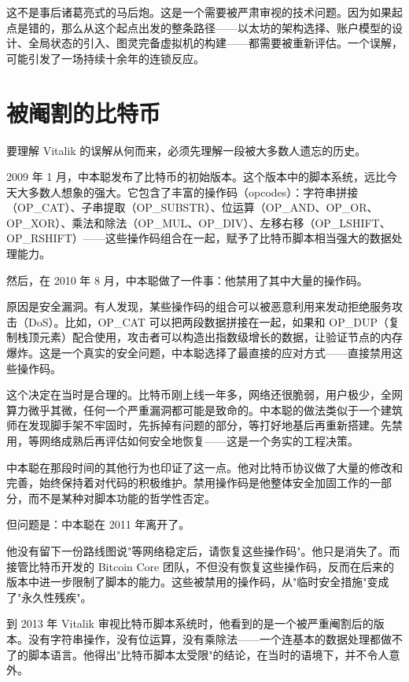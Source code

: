 \documentclass[a4paper,12pt,openany]{ctexbook}
\begin{document}
这不是事后诸葛亮式的马后炮。这是一个需要被严肃审视的技术问题。因为如果起点是错的，那么从这个起点出发的整条路径——以太坊的架构选择、账户模型的设计、全局状态的引入、图灵完备虚拟机的构建——都需要被重新评估。一个误解，可能引发了一场持续十余年的连锁反应。


\section*{被阉割的比特币}


要理解 Vitalik 的误解从何而来，必须先理解一段被大多数人遗忘的历史。

2009 年 1 月，中本聪发布了比特币的初始版本。这个版本中的脚本系统，远比今天大多数人想象的强大。它包含了丰富的操作码（opcodes）：字符串拼接（OP\_CAT）、子串提取（OP\_SUBSTR）、位运算（OP\_AND、OP\_OR、OP\_XOR）、乘法和除法（OP\_MUL、OP\_DIV）、左移右移（OP\_LSHIFT、OP\_RSHIFT）——这些操作码组合在一起，赋予了比特币脚本相当强大的数据处理能力。

然后，在 2010 年 8 月，中本聪做了一件事：他禁用了其中大量的操作码。

原因是安全漏洞。有人发现，某些操作码的组合可以被恶意利用来发动拒绝服务攻击（DoS）。比如，OP\_CAT 可以把两段数据拼接在一起，如果和 OP\_DUP（复制栈顶元素）配合使用，攻击者可以构造出指数级增长的数据，让验证节点的内存爆炸。这是一个真实的安全问题，中本聪选择了最直接的应对方式——直接禁用这些操作码。

这个决定在当时是合理的。比特币刚上线一年多，网络还很脆弱，用户极少，全网算力微乎其微，任何一个严重漏洞都可能是致命的。中本聪的做法类似于一个建筑师在发现脚手架不牢固时，先拆掉有问题的部分，等打好地基后再重新搭建。先禁用，等网络成熟后再评估如何安全地恢复——这是一个务实的工程决策。

中本聪在那段时间的其他行为也印证了这一点。他对比特币协议做了大量的修改和完善，始终保持着对代码的积极维护。禁用操作码是他整体安全加固工作的一部分，而不是某种对脚本功能的哲学性否定。

但问题是：中本聪在 2011 年离开了。

他没有留下一份路线图说"等网络稳定后，请恢复这些操作码"。他只是消失了。而接管比特币开发的 Bitcoin Core 团队，不但没有恢复这些操作码，反而在后来的版本中进一步限制了脚本的能力。这些被禁用的操作码，从"临时安全措施"变成了"永久性残疾"。

到 2013 年 Vitalik 审视比特币脚本系统时，他看到的是一个被严重阉割后的版本。没有字符串操作，没有位运算，没有乘除法——一个连基本的数据处理都做不了的脚本语言。他得出"比特币脚本太受限"的结论，在当时的语境下，并不令人意外。
\end{document}
